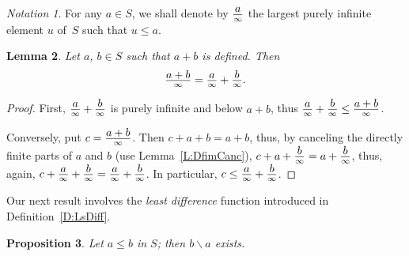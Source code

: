 \documentclass[psamsfonts,reqno]{memo-l}
\theoremstyle{plain}
\newtheorem{lemma}{Lemma}[section]
\newtheorem{proposition}[lemma]{Proposition}
\theoremstyle{definition}
\theoremstyle{remark}
\newtheorem{notation}[lemma]{Notation}
\numberwithin{equation}{section}
\newcommand{\sd}{\smallsetminus}
\newcommand{\di}[1]{\tfrac{\mathstrut\textstyle{#1}}{\scriptstyle{\infty}}}
\begin{document}
\begin{notation}
For any $a\in S$, we shall denote by $\di{a}$\index{adzzi@$\di{a}$|ii}
the largest purely infinite
element $u$ of~$S$ such that $u\leq a$.
\end{notation}

\begin{lemma}\label{L:a+b/infty}
Let $a$, $b\in S$ such that $a+b$ is defined. Then
   \[
   \di{a+b}=\di{a}+\di{b}.
   \]
\end{lemma}

\begin{proof}
First, $\di{a}+\di{b}$ is purely infinite and below $a+b$, thus
$\di{a}+\di{b}\leq\di{a+b}$.

Conversely, put $c=\di{a+b}$. Then $c+a+b=a+b$, thus, by
canceling the directly finite parts of $a$ and $b$
(use Lemma~\ref{L:DfimCanc}), $c+a+\di{b}=a+\di{b}$, thus, again,
$c+\di{a}+\di{b}=\di{a}+\di{b}$. In particular, $c\leq\di{a}+\di{b}$.
\end{proof}

Our next result involves the \emph{least difference} function introduced in
Definition~\ref{D:LsDiff}.

\begin{proposition}\label{P:bsminusa}
Let $a\leq b$ in $S$; then $b\sd a$ exists.
\end{proposition}
\end{document}
